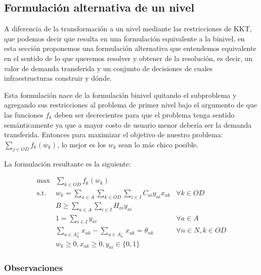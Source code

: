 \documentclass{article}
\begin{document}
  \subsection{Formulación alternativa de un nivel}
  \label{altOneLevelFormulation}

  A diferencia de la transformación a un nivel mediante las restricciones de KKT, que podemos decir que resulta en una formulación equivalente a la binivel, en esta sección proponemos una formulación alternativa que entendemos equivalente en el sentido de lo que queremos resolver y obtener de la resolución, es decir, un valor de demanda transferida y un conjunto de decisiones de cuales infraestructuras construir y dónde.

  Esta formulación nace de la formulación binivel quitando el subproblema y agregando sus restricciones al problema de primer nivel bajo el argumento de que las funciones $f_k$ deben ser decrecientes para que el problema tenga sentido semánticamente ya que a mayor costo de usuario menor debería ser la demanda transferida. Entonces para maximizar el objetivo de nuestro problema: $\sum_{j \in OD}f_k(w_k)$, lo mejor es los $w_k$ sean lo más chico posible.

  La formulación resultante es la siguiente:

  \begin{align}
    \text{max}    & \sum_{k \in OD} f_k(w_k)                                                         & \label{eq:objectivealt} \\
    \text{s.t.}\; & w_k = \sum_{a \in A} \sum_{k \in OD} \sum_{i \in I} C_{ai}y_{ai}x_{ak}           & \forall k \in OD \label{eq:shortestpathalt} \\
                  & B \geq \sum_{a \in A} \sum_{i \in I} H_{ai}y_{ai}                                & \label{eq:respectbudgetalt} \\
                  & 1 = \sum_{i \in I} y_{ai}                                                        & \forall a \in A \label{eq:alwaysoneyalt} \\
                  & \sum_{a \in A_n^+} x_{ak} - \sum_{a \in A_n^-} x_{ak} = \theta_{nk}              & \forall n \in N, k \in OD \label{eq:flowbalancealt} \\
                  & w_k \geq 0, x_{ak} \geq 0, y_{ai} \in \{0,1\}                                    & \nonumber
  \end{align}

  \subsubsection*{Observaciones}
\end{document}
